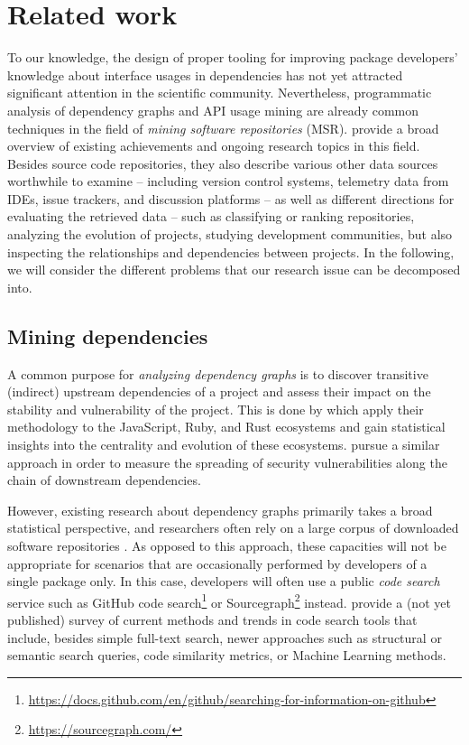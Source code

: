 \section{Related work}
\label{sec:related_work}

To our knowledge, the design of proper tooling for improving package developers' knowledge about interface usages in dependencies has not yet attracted significant attention in the scientific community.
Nevertheless, programmatic analysis of dependency graphs and API usage mining are already common techniques in the field of \emph{mining software repositories} (MSR).
\citet{chaturvedi2013tools} provide a broad overview of existing achievements and ongoing research topics in this field.
Besides source code repositories, they also describe various other data sources worthwhile to examine -- including version control systems, telemetry data from IDEs, issue trackers, and discussion platforms -- as well as different directions for evaluating the retrieved data -- such as classifying or ranking repositories, analyzing the evolution of projects, studying development communities, but also inspecting the relationships and dependencies between projects.
In the following, we will consider the different problems that our research issue can be decomposed into.

\subsection{Mining dependencies}
\label{sec:related_work/dependencies}

A common purpose for \emph{analyzing dependency graphs} is to discover transitive (indirect) upstream dependencies of a project and assess their impact on the stability and vulnerability of the project.
This is done by \citet{kikas2017structure} which apply their methodology to the JavaScript, Ruby, and Rust ecosystems and gain statistical insights into the centrality and evolution of these ecosystems.
\citet{decan2018impact} pursue a similar approach in order to measure the spreading of security vulnerabilities along the chain of downstream dependencies.

However, existing research about dependency graphs primarily takes a broad statistical perspective, and researchers often rely on a large corpus of downloaded software repositories \citep{abdalkareem2017developers,katz2020libraries,kikas2017structure}.
As opposed to this approach, these capacities will not be appropriate for scenarios that are occasionally performed by developers of a single package only.
In this case, developers will often use a public \emph{code search} service such as GitHub code search\footnote{\url{https://docs.github.com/en/github/searching-for-information-on-github}} or Sourcegraph\footnote{\url{https://sourcegraph.com/}} instead.
\citet{liu2020opportunities} provide a (not yet published) survey of current methods and trends in code search tools that include, besides simple full-text search, newer approaches such as structural or semantic search queries, code similarity metrics, or Machine Learning methods.

